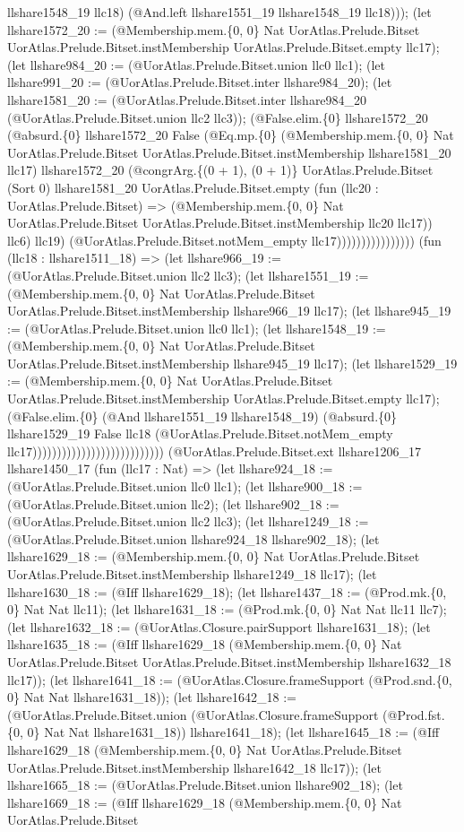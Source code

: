 \documentclass[11pt]{article}
\begin{document}
llshare1548\_19 llc18) (@And.left llshare1551\_19 llshare1548\_19 llc18))); (let llshare1572\_20 := (@Membership.mem.\{0, 0\} Nat UorAtlas.Prelude.Bitset UorAtlas.Prelude.Bitset.instMembership UorAtlas.Prelude.Bitset.empty llc17); (let llshare984\_20 := (@UorAtlas.Prelude.Bitset.union llc0 llc1); (let llshare991\_20 := (@UorAtlas.Prelude.Bitset.inter llshare984\_20); (let llshare1581\_20 := (@UorAtlas.Prelude.Bitset.inter llshare984\_20 (@UorAtlas.Prelude.Bitset.union llc2 llc3)); (@False.elim.\{0\} llshare1572\_20 (@absurd.\{0\} llshare1572\_20 False (@Eq.mp.\{0\} (@Membership.mem.\{0, 0\} Nat UorAtlas.Prelude.Bitset UorAtlas.Prelude.Bitset.instMembership llshare1581\_20 llc17) llshare1572\_20 (@congrArg.\{(0 + 1), (0 + 1)\} UorAtlas.Prelude.Bitset (Sort 0) llshare1581\_20 UorAtlas.Prelude.Bitset.empty (fun (llc20 : UorAtlas.Prelude.Bitset) => (@Membership.mem.\{0, 0\} Nat UorAtlas.Prelude.Bitset UorAtlas.Prelude.Bitset.instMembership llc20 llc17)) llc6) llc19) (@UorAtlas.Prelude.Bitset.notMem\_empty llc17)))))))))))))))) (fun (llc18 : llshare1511\_18) => (let llshare966\_19 := (@UorAtlas.Prelude.Bitset.union llc2 llc3); (let llshare1551\_19 := (@Membership.mem.\{0, 0\} Nat UorAtlas.Prelude.Bitset UorAtlas.Prelude.Bitset.instMembership llshare966\_19 llc17); (let llshare945\_19 := (@UorAtlas.Prelude.Bitset.union llc0 llc1); (let llshare1548\_19 := (@Membership.mem.\{0, 0\} Nat UorAtlas.Prelude.Bitset UorAtlas.Prelude.Bitset.instMembership llshare945\_19 llc17); (let llshare1529\_19 := (@Membership.mem.\{0, 0\} Nat UorAtlas.Prelude.Bitset UorAtlas.Prelude.Bitset.instMembership UorAtlas.Prelude.Bitset.empty llc17); (@False.elim.\{0\} (@And llshare1551\_19 llshare1548\_19) (@absurd.\{0\} llshare1529\_19 False llc18 (@UorAtlas.Prelude.Bitset.notMem\_empty llc17))))))))))))))))))))))))))) (@UorAtlas.Prelude.Bitset.ext llshare1206\_17 llshare1450\_17 (fun (llc17 : Nat) => (let llshare924\_18 := (@UorAtlas.Prelude.Bitset.union llc0 llc1); (let llshare900\_18 := (@UorAtlas.Prelude.Bitset.union llc2); (let llshare902\_18 := (@UorAtlas.Prelude.Bitset.union llc2 llc3); (let llshare1249\_18 := (@UorAtlas.Prelude.Bitset.union llshare924\_18 llshare902\_18); (let llshare1629\_18 := (@Membership.mem.\{0, 0\} Nat UorAtlas.Prelude.Bitset UorAtlas.Prelude.Bitset.instMembership llshare1249\_18 llc17); (let llshare1630\_18 := (@Iff llshare1629\_18); (let llshare1437\_18 := (@Prod.mk.\{0, 0\} Nat Nat llc11); (let llshare1631\_18 := (@Prod.mk.\{0, 0\} Nat Nat llc11 llc7); (let llshare1632\_18 := (@UorAtlas.Closure.pairSupport llshare1631\_18); (let llshare1635\_18 := (@Iff llshare1629\_18 (@Membership.mem.\{0, 0\} Nat UorAtlas.Prelude.Bitset UorAtlas.Prelude.Bitset.instMembership llshare1632\_18 llc17)); (let llshare1641\_18 := (@UorAtlas.Closure.frameSupport (@Prod.snd.\{0, 0\} Nat Nat llshare1631\_18)); (let llshare1642\_18 := (@UorAtlas.Prelude.Bitset.union (@UorAtlas.Closure.frameSupport (@Prod.fst.\{0, 0\} Nat Nat llshare1631\_18)) llshare1641\_18); (let llshare1645\_18 := (@Iff llshare1629\_18 (@Membership.mem.\{0, 0\} Nat UorAtlas.Prelude.Bitset UorAtlas.Prelude.Bitset.instMembership llshare1642\_18 llc17)); (let llshare1665\_18 := (@UorAtlas.Prelude.Bitset.union llshare902\_18); (let llshare1669\_18 := (@Iff llshare1629\_18 (@Membership.mem.\{0, 0\} Nat UorAtlas.Prelude.Bitset 
\end{document}
